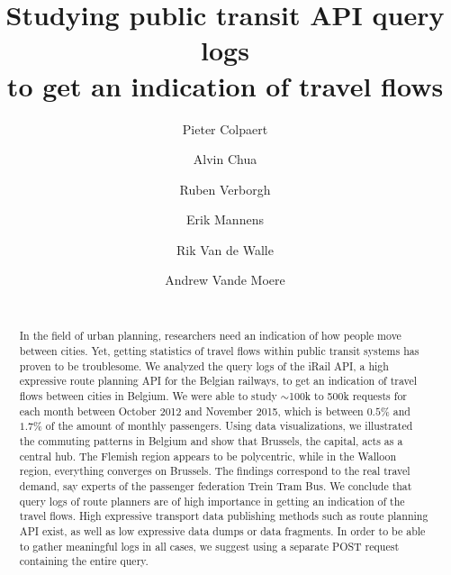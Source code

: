 \documentclass{sig-alternate}
\begin{document}
\title{Studying public transit API query logs\\ to get an indication of travel flows}
\author{
\alignauthor
Pieter Colpaert\\
\and
\alignauthor
Alvin Chua\\
\and
\alignauthor
Ruben Verborgh\\
\and
\alignauthor
Erik Mannens\\
\and
\alignauthor
Rik Van de Walle\\
\and
\alignauthor
Andrew Vande Moere\\
\\
}

\maketitle
\begin{abstract}

In the field of urban planning, researchers need an indication of how people move between cities. 
Yet, getting statistics of travel flows within public transit systems has proven to be troublesome.
We analyzed the query logs of the iRail API, a high expressive route planning API for the Belgian railways, to get an indication of travel flows between cities in Belgium.
We were able to study $\sim$100k to 500k requests for each month between October 2012 and November 2015, which is between $0.5\%$ and $1.7\%$ of the amount of monthly passengers.
Using data visualizations, we illustrated the commuting patterns in Belgium and show that Brussels, the capital, acts as a central hub. The Flemish region appears to be polycentric, while in the Walloon region, everything converges on Brussels.
The findings correspond to the real travel demand, say experts of the passenger federation Trein Tram Bus.
We conclude that query logs of route planners are of high importance in getting an indication of the travel flows.
High expressive transport data publishing methods such as route planning API exist, as well as low expressive data dumps or data fragments.
In order to be able to gather meaningful logs in all cases, we suggest using a separate POST request containing the entire query.

\end{abstract}
\end{document}
